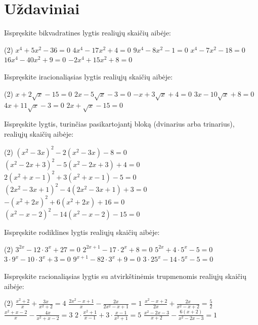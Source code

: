 \documentclass[11pt,a4paper]{scrartcl}
\begin{document}
\section{Uždaviniai}

\begin{problem}
Išspręskite bikvadratines lygtis realiųjų skaičių aibėje:
\begin{tasks}[label={(\arabic*)}, label-offset=0.9em](2)
    \task \(x^4+5x^2-36=0\)
    \task \(4x^4-17x^2+4=0\)
    \task \(9x^4-8x^2-1=0\)
    \task \(x^4-7x^2-18=0\)
    \task \(16x^4-40x^2+9=0\)
    \task \(-2x^4+15x^2+8=0\)
\end{tasks}
\end{problem}

\begin{problem}
Išspręskite iracionaliąsias lygtis realiųjų skaičių aibėje:
\begin{tasks}[label={(\arabic*)}, label-offset=0.9em](2)
    \task \(x+2\sqrt{x}-15=0\)
    \task \(2x-5\sqrt{x}-3=0\)
    \task \(-x+3\sqrt{x}+4=0\)
    \task \(3x-10\sqrt{x}+8=0\)
    \task \(4x+11\sqrt{x}-3=0\)
    \task \(2x+\sqrt{x}-15=0\)
\end{tasks}
\end{problem}

\begin{problem}
Išspręskite lygtis, turinčias pasikartojantį bloką (dvinarius arba trinarius), realiųjų skaičių aibėje:
\begin{tasks}[label={(\arabic*)}, label-offset=0.9em](2)
    \task \((x^2-3x)^2-2(x^2-3x)-8=0\)
    \task \((x^2-2x+3)^2-5(x^2-2x+3)+4=0\)
    \task \(2(x^2+x-1)^2+3(x^2+x-1)-5=0\)
    \task \((2x^2-3x+1)^2-4(2x^2-3x+1)+3=0\)
    \task \(-(x^2+2x)^2+6(x^2+2x)+16=0\)
    \task \((x^2-x-2)^2-14(x^2-x-2)-15=0\)
\end{tasks}
\end{problem}

\begin{problem}
Išspręskite rodiklines lygtis realiųjų skaičių aibėje:
\begin{tasks}[label={(\arabic*)}, label-offset=0.9em](2)
    \task \(3^{2x}-12\cdot 3^x+27=0\)
    \task \(2^{2x+1}-17\cdot 2^x+8=0\)
    \task \(5^{2x}+4\cdot 5^x-5=0\)
    \task \(3 \cdot 9^x-10\cdot 3^x+3=0\)
    \task \(9^{x+1}-82\cdot 3^x+9=0\)
    \task \(3\cdot 25^x-14\cdot 5^x-5=0\)
\end{tasks}
\end{problem}

\begin{problem}
Išspręskite racionaliąsias lygtis su atvirkštinėmis trupmenomis realiųjų skaičių aibėje:
\begin{tasks}[label={(\arabic*)}, label-offset=0.9em](2)
    \task \(\frac{x^2+2}{x} + \frac{3x}{x^2+2} = 4\)
    \task \(\frac{2x^2-x+1}{x} - \frac{2x}{2x^2-x+1} = 1\)
    \task \(\frac{x^2-x+2}{2x} + \frac{2x}{x^2-x+2} = \frac{5}{2}\)
    \task \(\frac{x^2+x-2}{x} - \frac{4x}{x^2+x-2} = 3\)
    \task \(2 \cdot \frac{x^2+1}{x-1} + 3 \cdot \frac{x-1}{x^2+1} = 5\)
    \task \(\frac{x^2-2x-3}{x+2} - \frac{6(x+2)}{x^2-2x-3} = 1\)
\end{tasks}
\end{problem}
\end{document}
